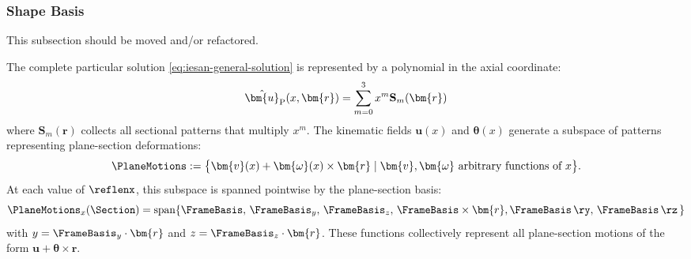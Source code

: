 \subsubsection{Shape Basis}\label{sec:shape-basis}
\begin{Note}
    This subsection should be moved and/or refactored.
\end{Note}
The complete particular solution \eqref{eq:iesan-general-solution} is represented by a polynomial in the axial coordinate:
\begin{equation*}
\hat{\bm{u}}_{\rm P}(x,\bm{r}) = \sum_{m =0}^3 x^m \mathbf{S}_m(\bm{r})
\end{equation*}
where $\mathbf{S}_m(\bm{r})$ collects all sectional patterns that multiply $x^m$. 
The kinematic fields $\bm{u}(x)$ and $\bm{\theta}(x)$ generate a subspace of patterns representing plane-section deformations:
\begin{equation*}
\PlaneMotions := \big\{\bm{v}(x) + \bm{\omega}(x) \times \bm{r} \mid \bm{v}, \bm{\omega} \text{ arbitrary functions of } x\big\}.
\end{equation*}
At each value of $\reflenx$, this subspace is spanned pointwise by the plane-section basis:
\begin{equation}
\PlaneMotions_x(\Section) = \operatorname{span}\{\FrameBasis,\,\FrameBasis_y,\, \FrameBasis_z,\, \FrameBasis \times \bm{r}, 
\FrameBasis\,\ry,\,
\FrameBasis\,\rz\,
\}
\label{eq:rigid-span}
\end{equation}
with \(y = \FrameBasis_{y} \cdot\bm{r}\) and \(z = \FrameBasis_{z}\cdot\bm{r}\). 
% 
These functions collectively represent all plane-section motions of the form \(\bm{u} + \bm{\theta}\times\bm{r}\). 


